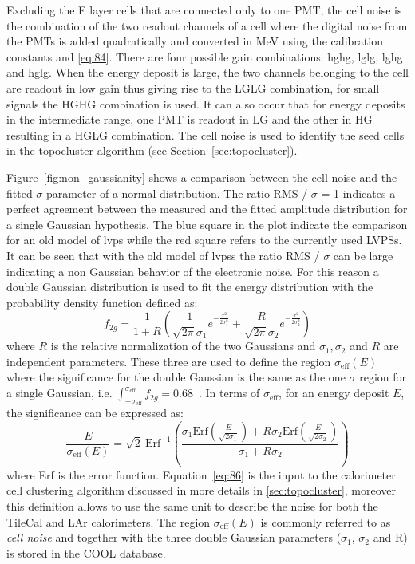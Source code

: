 Excluding the E layer cells that are connected only to one PMT, the cell noise
is the combination of the two readout channels of a cell where the digital noise
from the PMTs is added quadratically and converted in MeV using the calibration
constants and \cref{eq:84}. There are four possible gain combinations:
\gls{hghg}, \gls{lglg}, \gls{lghg} and \gls{hglg}. When the energy deposit is
large, the two channels belonging to the cell are readout in low gain thus
giving rise to the LGLG combination, for small signals the HGHG combination is
used. It can also occur that for energy deposits in the intermediate range, one
PMT is readout in LG and the other in HG resulting in a HGLG combination. The
cell noise is used to identify the seed cells in the topocluster algorithm (see
Section~\ref{sec:topocluster}).

Figure~\ref{fig:non_gaussianity} shows a comparison between the cell noise and
the fitted $\sigma$ parameter of a normal distribution. The ratio RMS / $\sigma$
= 1 indicates a perfect agreement between the measured and the fitted amplitude
distribution for a single Gaussian hypothesis. The blue square in the plot
indicate the comparison for an old model of \gls{lvps} while the red square
refers to the currently used LVPSs. It can be seen that with the old model of
\glspl{lvps} the ratio RMS / $\sigma$ can be large indicating a non Gaussian
behavior of the electronic noise. For this reason a double Gaussian distribution
is used to fit the energy distribution with the probability density function
defined as:
\begin{equation}
  \label{eq:85}
  f_{2g} = \frac{1}{1 + R} \left( \frac{1}{\sqrt{2 \pi} \sigma_1} e^{-
      \frac{x^2}{2 \sigma_1^2}} + \frac{R}{\sqrt{2 \pi} \sigma_2} e^{-
      \frac{x^2}{2 \sigma_2^2}} \right)
\end{equation}
where $R$ is the relative normalization of the two Gaussians and
$\sigma_1, \sigma_2$ and $R$ are independent parameters. These three are used to
define the region $\sigma_{\text{eff}}(E)$ where the significance for the double
Gaussian is the same as the one $\sigma$ region for a single Gaussian,
i.e.
$\int_{- \sigma_{\text{eff}}}^{\sigma_{\text{eff}}} f_{2g} =
0.68$~\cite{TileReadiness}.
In terms of $\sigma_{\text{eff}}$, for an energy deposit $E$, the significance
can be expressed as:
\begin{equation}
  \label{eq:86}
  \frac{E}{\sigma_{\text{eff}}(E)} = \sqrt{2}\ \text{Erf}^{- 1} \left( \frac{\sigma_1
      \text{Erf} \left(\frac{E}{\sqrt{2 \sigma_1}} \right) + R \sigma_2 \text{Erf}
    \left( \frac{E}{\sqrt{2 \sigma_2}} \right)}{\sigma_1 + R \sigma_2} \right)
\end{equation}
where Erf is the error function. Equation~\ref{eq:86} is the input to the
calorimeter cell clustering algorithm discussed in more details in
\cref{sec:topocluster}, moreover this definition allows to use the same unit to
describe the noise for both the TileCal and LAr calorimeters. The region
$\sigma_{\text{eff}}(E)$ is commonly referred to as \emph{cell noise} and
together with the three double Gaussian parameters ($\sigma_1$, $\sigma_2$ and
R) is stored in the COOL database.

